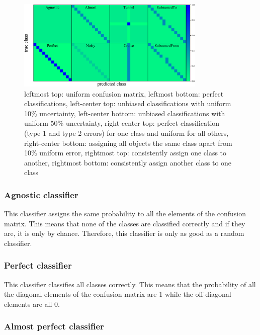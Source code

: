 \begin{figure}
	\begin{center}
    \includegraphics[width=0.8\textwidth]{./fig/all_sim_cm.png}
		\caption{leftmost top: uniform confusion matrix,
    leftmost bottom: perfect classifications,
    left-center top: unbiased classifications with uniform 10\% uncertainty,
    left-center bottom: unbiased classifications with uniform 50\% uncertainty,
    right-center top: perfect classification (type 1 and type 2 errors) for one class and uniform for all others,
    right-center bottom: assigning all objects the same class apart from 10\% uniform error,
    rightmost top: consistently assign one class to another,
    rightmost bottom: consistently assign another class to one class}
		\label{fig:mock_cm}
	\end{center}
\end{figure}

\subsubsection{Agnostic classifier}
\label{sec:agnostic_data}

This classifier assigns the same probability to all the elements of the confusion matrix.
This means that none of the classes are classified correctly and if they are, it is only by chance.
Therefore, this classifier is only as good as a random classifier.

\subsubsection{Perfect classifier}
\label{sec:perfect_data}

This classifier classifies all classes correctly.
This means that the probability of all the diagonal elements of the confusion matrix are 1 while the off-diagonal elements are all 0.

\subsubsection{Almost perfect classifier}
\label{sec:almost_data}

